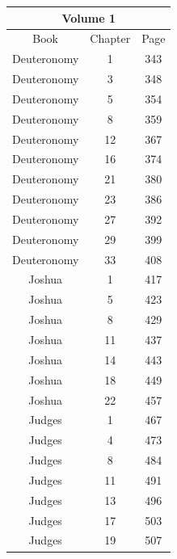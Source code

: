 \documentclass{article}
\newlength{\minipageheight}
\newlength{\minipagewidth}
\begin{document}
%
%
\begin{minipage}[r][\minipageheight][t]{\minipagewidth}%
    \begin{center}
        \renewcommand{\arraystretch}{1.0}
        \begin{tabular}{|c|c|c|}
            \hline
            \multicolumn{3}{|c|}{Volume 1} \\
            \hline
            Book        & Chapter & Page   \\
            \hline
            Deuteronomy & 1       & 343    \\
            Deuteronomy & 3       & 348    \\
            Deuteronomy & 5       & 354    \\
            Deuteronomy & 8       & 359    \\
            Deuteronomy & 12      & 367    \\
            Deuteronomy & 16      & 374    \\
            Deuteronomy & 21      & 380    \\
            Deuteronomy & 23      & 386    \\
            Deuteronomy & 27      & 392    \\
            Deuteronomy & 29      & 399    \\
            Deuteronomy & 33      & 408    \\
            Joshua      & 1       & 417    \\
            Joshua      & 5       & 423    \\
            Joshua      & 8       & 429    \\
            Joshua      & 11      & 437    \\
            Joshua      & 14      & 443    \\
            Joshua      & 18      & 449    \\
            Joshua      & 22      & 457    \\
            Judges      & 1       & 467    \\
            Judges      & 4       & 473    \\
            Judges      & 8       & 484    \\
            Judges      & 11      & 491    \\
            Judges      & 13      & 496    \\
            Judges      & 17      & 503    \\
            Judges      & 19      & 507    \\

\end{tabular}
\end{center}
\end{minipage}
\end{document}
